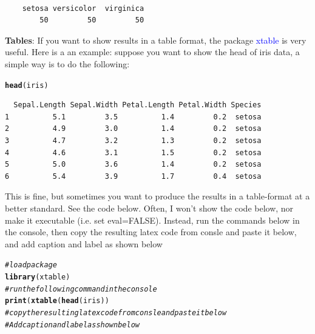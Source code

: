 \documentclass[10pt]{article}\usepackage[]{graphicx}\usepackage[]{color}
\makeatletter
\newcommand{\hlcom}[1]{\textcolor[rgb]{0.678,0.584,0.686}{\textit{#1}}}%
\newcommand{\hlstd}[1]{\textcolor[rgb]{0.345,0.345,0.345}{#1}}%
\newcommand{\hlkwd}[1]{\textcolor[rgb]{0.737,0.353,0.396}{\textbf{#1}}}%
\newenvironment{kframe}{%
 \def\at@end@of@kframe{}%
 \ifinner\ifhmode%
  \def\at@end@of@kframe{\end{minipage}}%
  \begin{minipage}{\columnwidth}%
 \fi\fi%
 \def\FrameCommand##1{\hskip\@totalleftmargin \hskip-\fboxsep
 \colorbox{shadecolor}{##1}\hskip-\fboxsep
     \hskip-\linewidth \hskip-\@totalleftmargin \hskip\columnwidth}%
 \MakeFramed {\advance\hsize-\width
   \@totalleftmargin\z@ \linewidth\hsize
   \@setminipage}}%
 {\par\unskip\endMakeFramed%
 \at@end@of@kframe}
\newenvironment{knitrout}{}{} %
\makeatother
\begin{document}
\begin{knitrout}
\color{fgcolor}\begin{kframe}
\begin{verbatim}

    setosa versicolor  virginica 
        50         50         50 
\end{verbatim}
\end{kframe}
\end{knitrout}

\textbf{Tables}: If you want to show results in a table format, the package \textcolor{blue}{xtable} is very useful. Here is a an example: suppose you want to show the head of iris data, a simple way is to do the following: 

\begin{knitrout}
\color{fgcolor}\begin{kframe}
\begin{alltt}
\hlkwd{head}\hlstd{(iris)}
\end{alltt}
\end{kframe}
\end{knitrout}

\begin{knitrout}
\color{fgcolor}\begin{kframe}
\begin{verbatim}
  Sepal.Length Sepal.Width Petal.Length Petal.Width Species
1          5.1         3.5          1.4         0.2  setosa
2          4.9         3.0          1.4         0.2  setosa
3          4.7         3.2          1.3         0.2  setosa
4          4.6         3.1          1.5         0.2  setosa
5          5.0         3.6          1.4         0.2  setosa
6          5.4         3.9          1.7         0.4  setosa
\end{verbatim}
\end{kframe}
\end{knitrout}

This is fine, but sometimes you want to produce  the results in a table-format at a better standard. See the code below. Often, I won't show the code below, nor make it executable (i.e. set eval=FALSE). Instead, run the commands below in the console, then copy the resulting latex code from consle and paste it below, and add caption and label as shown below

\begin{knitrout}
\color{fgcolor}\begin{kframe}
\begin{alltt}
\hlcom{# load package }
\hlkwd{library}(xtable)
\hlcom{# run the following command in the console}
\hlkwd{print}(\hlkwd{xtable}(\hlkwd{head}(iris))
\hlcom{# copy the resulting latex code from consle and paste it below}
\hlcom{# Add caption and label as shown below}
\end{alltt}
\end{kframe}
\end{knitrout}
\end{document}
